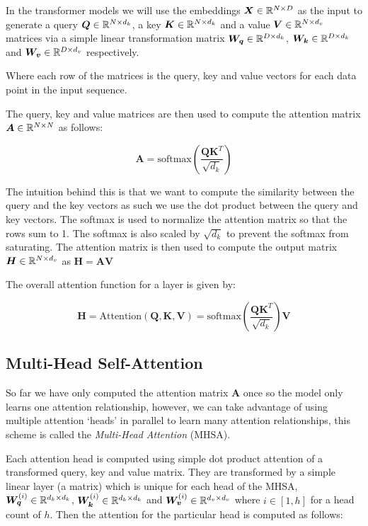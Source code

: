 \documentclass[../../main.tex]{subfiles}
\begin{document}
In the transformer models we will use the embeddings $\bm{X} \in \mathbb{R}^{N \times D}$ as the input to generate a query $\bm{Q} \in \mathbb{R}^{N \times d_k}$, a key $\bm{K} \in \mathbb{R}^{N \times d_k}$ and a value $\bm{V} \in \mathbb{R}^{N \times d_v}$ matrices via a simple linear transformation matrix $\bm{W_q} \in \mathbb{R}^{D \times d_k}$, $\bm{W_k} \in \mathbb{R}^{D \times d_k}$ and $\bm{W_v} \in \mathbb{R}^{D \times d_v}$ respectively. 

Where each row of the matrices is the query, key and value vectors for each data point in the input sequence. 

The query, key and value matrices are then used to compute the attention matrix $\bm{A} \in \mathbb{R}^{N \times N}$ as follows:

\begin{equation}
    \bm{A} = \text{softmax}\left(\frac{\bm{Q}\bm{K}^T}{\sqrt{d_k}}\right)
\end{equation}

\noi The intuition behind this is that we want to compute the similarity between the query and the key vectors as such we use the dot product between the query and key vectors. The softmax is used to normalize the attention matrix so that the rows sum to 1. The softmax is also scaled by $\sqrt{d_k}$ to prevent the softmax from saturating. The attention matrix is then used to compute the output matrix $\bm{H} \in \mathbb{R}^{N \times d_v}$ as $\bm{H} = \bm{A}\bm{V}$

The overall attention function for a layer is given by:

\begin{equation}
    \bm{H} =\text{Attention}(\bm{Q}, \bm{K}, \bm{V}) = \text{softmax}\left(\frac{\bm{Q}\bm{K}^T}{\sqrt{d_k}}\right)\bm{V}
\end{equation}

\subsection{Multi-Head Self-Attention}

So far we have only computed the attention matrix $\bm{A}$ once so the model only learns one attention relationship, however, we can take advantage of using multiple attention `heads' in parallel to learn many attention relationships, this scheme is called the \emph{Multi-Head Attention} (MHSA). 

Each attention head is computed using simple dot product attention of a transformed query, key and value matrix. They are transformed by a simple linear layer (a matrix) which is unique for each head of the MHSA, $\bm{W_q}^{(i)} \in \mathbb{R}^{d_k \times d_k}$, $\bm{W_k}^{(i)} \in \mathbb{R}^{d_k \times d_k}$ and $\bm{W_v}^{(i)} \in \mathbb{R}^{d_v \times d_v}$ where $i \in [1, h]$ for a head count of $h$. Then the attention for the particular head is computed as follows:
\end{document}

